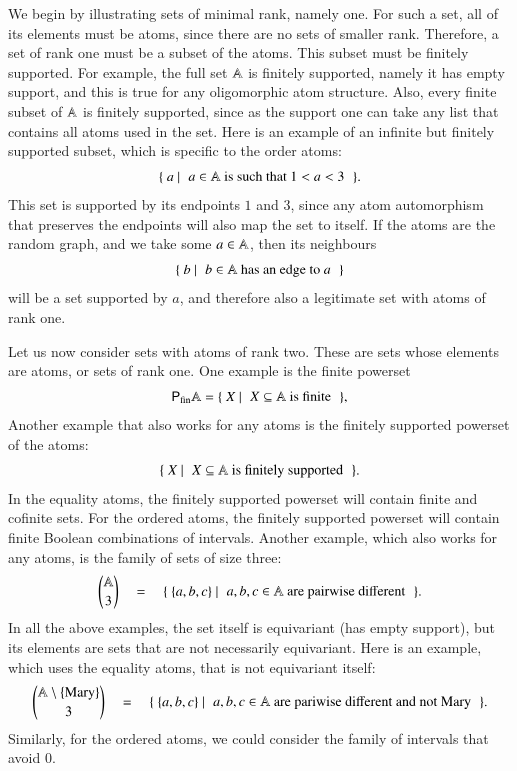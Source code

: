 \begin{myexample} \label{ex:sets-with-atoms-of-rank-one}
	We begin by illustrating sets of minimal rank, namely one. For such a set, all of its elements must be atoms, since there are no sets of smaller rank. Therefore, a set of rank one must be a subset of the atoms. This subset must be finitely supported. For example, the full set $\mathbb A$ is finitely supported, namely it has empty support, and this is true for any oligomorphic atom structure. Also, every finite subset of $\mathbb A$ is finitely supported, since as the support one can take any list that contains all atoms used in the set. Here is an example of an infinite but finitely supported subset, which is specific to the order atoms:
	\begin{align*}
		 \setbuild{ a } { $a \in \atoms$ is such that $1 < a < 3$}.
	\end{align*}
	This set is supported by its endpoints  $1$ and $3$, since any atom automorphism that preserves the endpoints will also map the set to itself. If the atoms are the random graph, and we take some $a \in \mathbb A$, then its neighbours 
	\begin{align*}
	\setbuild{ b}{ $b \in \atoms$ has an edge to $a$}
	\end{align*}
	will be a set supported by $a$, and therefore also a legitimate set with atoms of rank one.
\end{myexample}

\begin{myexample}\label{ex:sets-with-atoms-of-rank-two}
	Let us now consider sets with atoms of rank two. These are sets whose elements are atoms, or sets of rank one. One example is the   finite powerset 
\begin{align*}
\pfin \atoms = \setbuild{ X}{$X \subseteq \atoms$ is finite},
\end{align*}
Another  example that also works for any atoms is the finitely supported powerset of the atoms:
\begin{align*}
\setbuild{ X}{$X \subseteq \atoms$ is finitely supported}.
\end{align*}
In the equality atoms, the finitely supported powerset will contain finite and cofinite sets. For the ordered atoms, the finitely supported powerset will contain finite Boolean combinations of intervals. Another example, which also works for any atoms,  is the family of sets of size three:
\begin{align*}
{\atoms \choose 3} 
\quad = \quad 
 \setbuild{ \set{a,b,c}}{$a,b,c \in \atoms$ are pairwise different}.
\end{align*}
In all the above examples, the set itself is equivariant (has empty support), but its elements are sets that are not necessarily equivariant. Here is an example, which uses the equality atoms, that is not equivariant itself: 
\begin{align*}
	{{\atoms \setminus \set{\mary} \choose 3}} 
	\quad = \quad  
\setbuild{ \set{a,b,c}}{$a,b,c \in \atoms$ are pariwise different and  not  Mary}.
\end{align*}
Similarly, for the ordered atoms, we could consider the family of intervals that avoid 0. 
\end{myexample}

